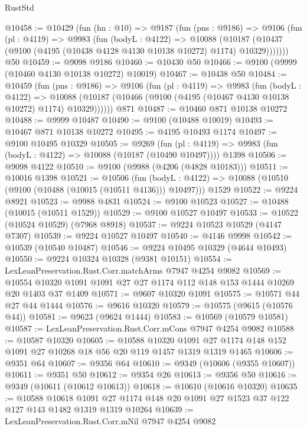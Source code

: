 \begin{lexlean}{RustStd}
\begin{coremodule}
@10458 := @10429
    (fun (hn : @10) =>
    @9187
      (fun (pns : @9186) =>
      @9106
        (fun (pl : @4119) =>
        @9983
          (fun (bodyL : @4122) =>
          @10088
            (@10187 (@10437 (@9100 (@4195 (@10438 @4128 @4130 @10138 @10272) @1174) @10329)))))))
    @50
@10459 := @9098 @9186
@10460 := @10430 @50
@10466 := @9100 (@9999 (@10460 @4130 @10138 @10272) @10019)
@10467 := @10438 @50
@10484 := @10459
    (fun (pns : @9186) =>
    @9106
      (fun (pl : @4119) =>
      @9983
        (fun (bodyL : @4122) =>
        @10088 (@10187 (@10466 (@9100 (@4195 (@10467 @4130 @10138 @10272) @1174) @10329))))))
    @871
@10487 := @10460 @871 @10138 @10272
@10488 := @9999 @10487
@10490 := @9100 (@10488 @10019)
@10493 := @10467 @871 @10138 @10272
@10495 := @4195 @10493 @1174
@10497 := @9100 @10495 @10329
@10505 := @9269
    (fun (pl : @4119) => @9983 (fun (bodyL : @4122) => @10088 (@10187 (@10490 @10497))))
    @1398
@10506 := @9098 @4122
@10510 := @9100 (@9988 (@4206 (@4828 @10183)))
@10511 := @10016 @1398
@10521 := @10506
    (fun (bodyL : @4122) => @10088 (@10510 (@9100 (@10488 (@10015 (@10511 @4136))) @10497)))
    @1529
@10522 := @9224 @8921
@10523 := @9988 @4831
@10524 := @9100 @10523
@10527 := @10488 (@10015 (@10511 @1529))
@10529 := @9100 @10527 @10497
@10533 := @10522 (@10524 @10529) (@7968 @8918)
@10537 := @9224 @10523 @10529 (@4147 @7307)
@10539 := @9224 @10527 @10497
@10540 := @4146 @9998
@10542 := @10539 (@10540 @10487)
@10546 := @9224 @10495 @10329 (@4644 @10493)
@10550 := @9224 @10324 @10328 (@9381 @10151)
@10554 := LexLeanPreservation.Rust.Corr.matchArms @7947 @4254 @9082
@10569 := @10554 @10320 @1091 @1091 @27 @27 @1174 @112 @148 @153 @1444 @10269 @20 @1403 @37 @1409
@10571 := @9607 @10320 @1091
@10575 := @10571 @44 @27 @44 @1444
@10576 := @9616 @10320
@10579 := @10575 (@9615 (@10576 @44))
@10581 := @9623 (@9624 @1444)
@10583 := @10569 (@10579 @10581)
@10587 := LexLeanPreservation.Rust.Corr.mCons @7947 @4254 @9082
@10588 := @10587 @10320
@10605 := @10588
    @10320
    @1091
    @27
    @1174
    @148
    @152
    @1091
    @27
    @10268
    @18
    @56
    @20
    @119
    @1457
    @1319
    @1319
    @1465
@10606 := @9351 @64
@10607 := @9356 @64
@10610 := @9349 (@10606 (@9355 @10607))
@10611 := @9351 @50
@10612 := @9354 @26
@10613 := @9356 @50
@10616 := @9349 (@10611 (@10612 @10613))
@10618 := @10610 (@10616 @10320)
@10635 := @10588
    @10618
    @1091
    @27
    @1174
    @148
    @20
    @1091
    @27
    @1523
    @37
    @122
    @127
    @143
    @1482
    @1319
    @1319
    @10264
@10639 := LexLeanPreservation.Rust.Corr.mNil @7947 @4254 @9082

\end{coremodule}
\end{lexlean}
